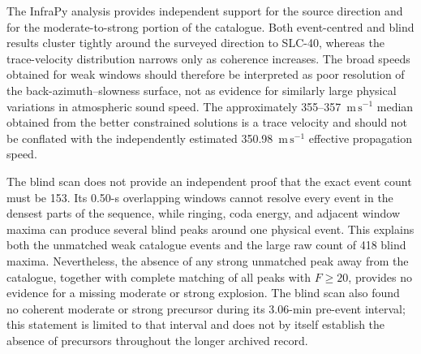 The InfraPy analysis provides independent support for the source direction and
for the moderate-to-strong portion of the catalogue.  Both event-centred and
blind results cluster tightly around the surveyed direction to SLC-40, whereas
the trace-velocity distribution narrows only as coherence increases.  The
broad speeds obtained for weak windows should therefore be interpreted as poor
resolution of the back-azimuth--slowness surface, not as evidence for similarly
large physical variations in atmospheric sound speed.  The approximately
355--357~\(\mathrm{m\,s^{-1}}\) median obtained from the better constrained
solutions is a trace velocity and should not be conflated with the independently
estimated 350.98~\(\mathrm{m\,s^{-1}}\) effective propagation speed.

The blind scan does not provide an independent proof that the exact event count
must be 153.  Its 0.50-s overlapping windows cannot resolve every event in the
densest parts of the sequence, while ringing, coda energy, and adjacent window
maxima can produce several blind peaks around one physical event.  This explains
both the unmatched weak catalogue events and the large raw count of 418 blind
maxima.  Nevertheless, the absence of any strong unmatched peak away from the
catalogue, together with complete matching of all peaks with \(F\geq20\),
provides no evidence for a missing moderate or strong explosion.  The blind
scan also found no coherent moderate or strong precursor during its 3.06-min
pre-event interval; this statement is limited to that interval and does not by
itself establish the absence of precursors throughout the longer archived
record.
